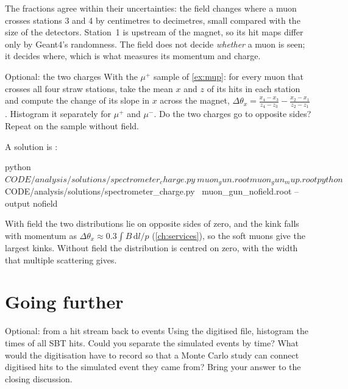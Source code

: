 \begin{solution}
The fractions agree within their uncertainties: the field changes where a
muon crosses stations 3 and 4 by centimetres to decimetres, small compared
with the size of the detectors. Station~1 is upstream of the magnet, so its
hit maps differ only by Geant4's randomness. The field does not decide
\emph{whether} a muon is seen; it decides where, which is what measures its
momentum and charge. 
\end{solution}

\begin{exercise}[colback=white]{Optional: the two charges}
With the $\mu^+$ sample of \cref{ex:mup}: for every muon that crosses all
four straw stations, take the mean $x$ and $z$ of its hits in each station
and compute the change of its slope in $x$ across the magnet,
$\Delta\theta_x = \frac{x_4-x_3}{z_4-z_3} - \frac{x_2-x_1}{z_2-z_1}$.
Histogram it separately for $\mu^+$ and $\mu^-$. Do the two charges go to
opposite sides? Repeat on the sample without field.
\end{exercise}

\begin{solution}
A solution is :
\begin{shell}
python $CODE/analysis/solutions/spectrometer_charge.py \
    muon_gun.root muon_gun_mup.root
python $CODE/analysis/solutions/spectrometer_charge.py \
    muon_gun_nofield.root --output nofield
\end{shell}
With field the two distributions lie on opposite sides of zero, and the kink
falls with momentum as $\Delta\theta_x \approx 0.3\int B\,\mathrm{d}l / p$
(\cref{ch:services}), so the soft muons give the largest kinks. Without field
the distribution is centred on zero, with the width that multiple scattering
gives.
\end{solution}

\section{Going further}

\begin{exercise}[colback=white]{Optional: from a hit stream back to events}
Using the digitised file, histogram the times of all SBT hits. Could you
separate the simulated events by time? What would the digitisation have to
record so that a Monte Carlo study can connect digitised hits to the
simulated event they came from? Bring your answer to the closing discussion.
\end{exercise}

